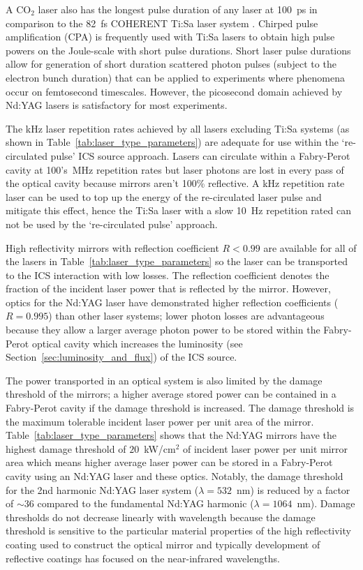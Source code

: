 \documentclass[../main.tex]{subfiles}
\begin{document}
A CO$_{2}$ laser also has the longest pulse duration of any laser at 100~\si{\pico\second} in comparison to the 82~\si{\femto\second} COHERENT Ti:Sa laser system \cite{priebe2008inverse}. Chirped pulse amplification (CPA) \cite{strickland1985compression} is frequently used with Ti:Sa lasers to obtain high pulse powers on the Joule-scale with short pulse durations. Short laser pulse durations allow for generation of short duration scattered photon pulses (subject to the electron bunch duration) that can be applied to experiments where phenomena occur on femtosecond timescales. However, the picosecond domain achieved by Nd:YAG lasers is satisfactory for most experiments.

The \si{\kilo\hertz} laser repetition rates achieved by all lasers excluding Ti:Sa systems (as shown in Table~\ref{tab:laser_type_parameters}) are adequate for use within the `re-circulated pulse' ICS source approach. Lasers can circulate within a Fabry-Perot cavity at 100's~\si{\mega\hertz} repetition rates but laser photons are lost in every pass of the optical cavity because mirrors aren't 100\% reflective. A \si{\kilo\hertz} repetition rate laser can be used to top up the energy of the re-circulated laser pulse and mitigate this effect, hence the Ti:Sa laser with a slow 10~\si{\hertz} repetition rated can not be used by the `re-circulated pulse' approach.

High reflectivity mirrors with reflection coefficient $R < 0.99$ are available for all of the lasers in Table~\ref{tab:laser_type_parameters} so the laser can be transported to the ICS interaction with low losses. The reflection coefficient denotes the fraction of the incident laser power that is reflected by the mirror. However, optics for the Nd:YAG laser have demonstrated higher reflection coefficients ($R=0.995$) than other laser systems; lower photon losses are advantageous because they allow a larger average photon power to be stored within the Fabry-Perot optical cavity which increases the luminosity (see Section~\ref{sec:luminosity_and_flux}) of the ICS source.

The power transported in an optical system is also limited by the damage threshold of the mirrors; a higher average stored power can be contained in a Fabry-Perot cavity if the damage threshold is increased. The damage threshold is the maximum tolerable incident laser power per unit area of the mirror. Table~\ref{tab:laser_type_parameters} shows that the Nd:YAG mirrors have the highest damage threshold of $20$~\si{\kilo\watt}/\si{\centi\meter}$^{2}$ of incident laser power per unit mirror area which means higher average laser power can be stored in a Fabry-Perot cavity using an Nd:YAG laser and these optics. Notably, the damage threshold for the 2nd harmonic Nd:YAG laser system ($\lambda = 532$~\si{\nano\meter}) is reduced by a factor of $\sim36$ compared to the fundamental Nd:YAG harmonic ($\lambda = 1064$~\si{\nano\meter}). Damage thresholds do not decrease linearly with wavelength because the damage threshold is sensitive to the particular material properties of the high reflectivity coating used to construct the optical mirror and typically development of reflective coatings has focused on the near-infrared wavelengths.  
\end{document}
